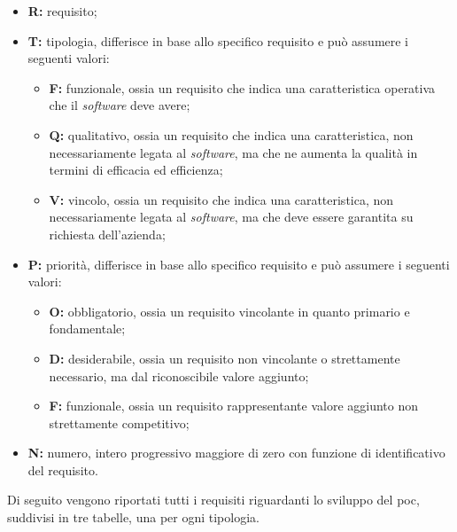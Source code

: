\begin{itemize}
	\item \textbf{R:} requisito;
	
	\item \textbf{T:} tipologia, differisce in base allo specifico requisito e può assumere i seguenti valori:
		\begin{itemize}
			\item \textbf{F:} funzionale, ossia un requisito che indica una caratteristica operativa che il \textit{software} deve avere;
			\item \textbf{Q:} qualitativo, ossia un requisito che indica una caratteristica, non necessariamente legata al \textit{software}, ma che ne aumenta la qualità in termini di efficacia ed efficienza;
			\item \textbf{V:} vincolo, ossia un requisito che indica una caratteristica, non necessariamente legata al \textit{software}, ma che deve essere garantita su richiesta dell'azienda;
		\end{itemize}
	
	\item \textbf{P:} priorità, differisce in base allo specifico requisito e può assumere i seguenti valori:
		\begin{itemize}
			\item \textbf{O:} obbligatorio, ossia un requisito vincolante in quanto primario e fondamentale;
			\item \textbf{D:} desiderabile, ossia un requisito non vincolante o strettamente necessario, ma dal riconoscibile valore aggiunto;
			\item \textbf{F:} funzionale, ossia un requisito rappresentante valore aggiunto non strettamente competitivo; 
		\end{itemize}
	
	\item \textbf{N:} numero, intero progressivo maggiore di zero con funzione di identificativo del requisito.
\end{itemize}

Di seguito vengono riportati tutti i requisiti riguardanti lo sviluppo del \gls{poc}, suddivisi in tre tabelle, una per ogni tipologia.


